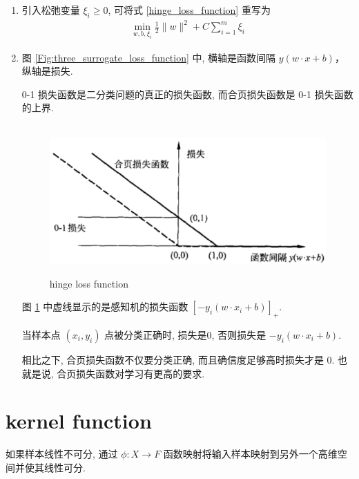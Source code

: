 \documentclass[oneside, 12pt]{ctexbook}
\begin{document}
\begin{enumerate}
					\item 引入松弛变量 $\xi_i \geq 0$, 可将式 \ref{hinge_loss_function} 重写为
						\begin{align}
							\min_{w,b,\xi_i} \frac{1}{2} \parallel w \parallel ^2 + C\sum_{i=1}^{m}\xi_i 
						\end{align}
						
					\item 图 \ref{Fig:three_surrogate_loss_function} 中, 横轴是函数间隔 $y(w \cdot x + b)$，纵轴是损失.
					
						0-1 损失函数是二分类问题的真正的损失函数, 而合页损失函数是 0-1 损失函数的上界. 
						\begin{figure}[H]	
							\vspace{-0.2cm}  %
							\setlength{\abovecaptionskip}{-0.2cm}   %
							\centering
							\includegraphics[scale=0.4]{hinge_loss_function.png}
							\renewcommand{\figurename}{Fig} %
							\caption{hinge loss function}
							\label{Fig:hinge_loss_function}
						\end{figure}
						图 \ref{Fig:hinge_loss_function} 中虚线显示的是感知机的损失函数 $[-y_i (w \cdot x_i + b)]_+$. 
						
						当样本点 $(x_i, y_i)$ 点被分类正确时, 损失是0, 否则损失是 $-y_i(w \cdot x_i + b)$.
						
						相比之下, 合页损失函数不仅要分类正确, 而且确信度足够高时损失才是 0. 也就是说, 合页损失函数对学习有更高的要求.
				\end{enumerate}
				
		\section{\quad kernel function}
			如果样本线性不可分, 通过 $\phi : X \rightarrow F$ 函数映射将输入样本映射到另外一个高维空间并使其线性可分.
			
\end{document}
